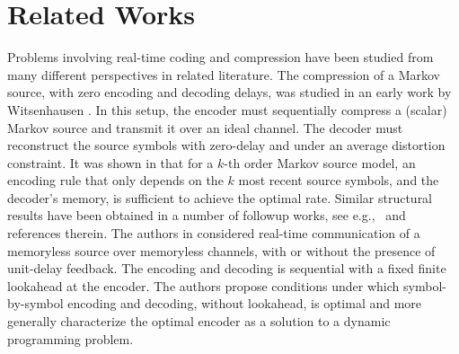 \documentclass[journal, twocolumn, 10pt]{IEEEtran}
\begin{document}
\section{ Related Works}
\label{sec:Background}
Problems involving real-time coding and compression have been studied from many different perspectives in related literature.
The compression of a Markov source, with zero encoding and decoding delays, was studied in an early work by Witsenhausen \cite{Witsenhausen:79}. In this setup, the encoder must  sequentially compress a (scalar) Markov source and transmit it
over an ideal channel. The decoder must reconstruct the source symbols with zero-delay and under an average distortion constraint.
It was shown in \cite{Witsenhausen:79} that for a $k$-th order Markov source model, an encoding rule that only depends on the $k$ most recent source symbols, and the decoder's memory, is sufficient to achieve the optimal rate.  Similar structural results have been  obtained in a number of followup works, see e.g.,~\cite{Teneketzis} and references therein. The authors in \cite{Asnani} considered real-time communication of a  memoryless source over memoryless channels, with or without the presence of unit-delay feedback. The encoding and decoding is sequential with a fixed finite lookahead at the encoder. The authors  propose conditions under which  symbol-by-symbol encoding and decoding, without lookahead, is optimal and more generally characterize the optimal encoder as a solution to a dynamic programming problem.

\end{document}
